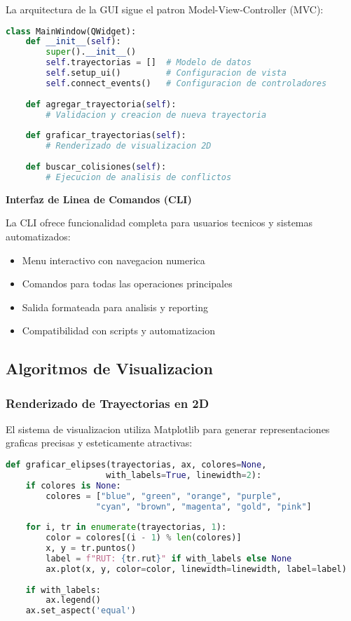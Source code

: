 \documentclass[12pt,a4paper]{article}
\begin{document}
La arquitectura de la GUI sigue el patron Model-View-Controller (MVC):

\begin{lstlisting}[language=Python, caption=Estructura principal de la GUI]
class MainWindow(QWidget):
    def __init__(self):
        super().__init__()
        self.trayectorias = []  # Modelo de datos
        self.setup_ui()         # Configuracion de vista
        self.connect_events()   # Configuracion de controladores
    
    def agregar_trayectoria(self):
        # Validacion y creacion de nueva trayectoria
        
    def graficar_trayectorias(self):
        # Renderizado de visualizacion 2D
        
    def buscar_colisiones(self):
        # Ejecucion de analisis de conflictos
\end{lstlisting}

\textbf{Interfaz de Linea de Comandos (CLI)}

La CLI ofrece funcionalidad completa para usuarios tecnicos y sistemas automatizados:

\begin{itemize}
    \item Menu interactivo con navegacion numerica
    \item Comandos para todas las operaciones principales
    \item Salida formateada para analisis y reporting
    \item Compatibilidad con scripts y automatizacion
\end{itemize}

\subsection{Algoritmos de Visualizacion}

\subsubsection{Renderizado de Trayectorias en 2D}

El sistema de visualizacion utiliza Matplotlib para generar representaciones graficas precisas y esteticamente atractivas:

\begin{lstlisting}[language=Python, caption=Funcion de graficado de elipses 2D]
def graficar_elipses(trayectorias, ax, colores=None, 
                    with_labels=True, linewidth=2):
    if colores is None:
        colores = ["blue", "green", "orange", "purple", 
                  "cyan", "brown", "magenta", "gold", "pink"]
    
    for i, tr in enumerate(trayectorias, 1):
        color = colores[(i - 1) % len(colores)]
        x, y = tr.puntos()
        label = f"RUT: {tr.rut}" if with_labels else None
        ax.plot(x, y, color=color, linewidth=linewidth, label=label)
    
    if with_labels:
        ax.legend()
    ax.set_aspect('equal')
\end{lstlisting}
\end{document}
